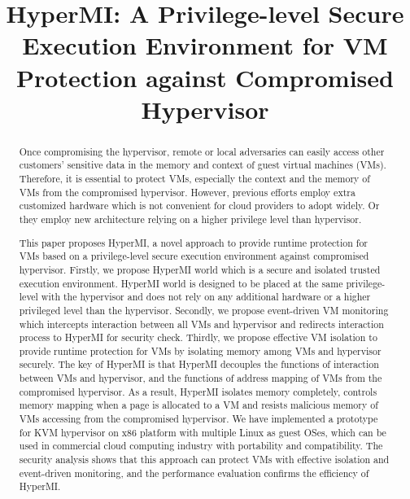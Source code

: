 \documentclass[conference]{IEEEtran}
\begin{document}
\title{HyperMI: A Privilege-level Secure Execution Environment for VM Protection against Compromised Hypervisor}
\author{
\IEEEauthorblockA{\textit{Institute of Information Engineering, Chinese Academy of Sciences} \\
\textit{School of Cyber Security, University of Chinese Academy of Sciences}\\
\{liuwenqing,linkunli,zhangkun,tubibo\}@iie.ac.cn}


}

\maketitle

\begin{abstract}

Once compromising the hypervisor, remote or local adversaries can easily access other customers' sensitive data in the memory and context of guest virtual machines (VMs).
Therefore, it is essential to protect VMs, especially the context and the memory of VMs from the compromised hypervisor.
However, previous efforts employ extra customized hardware which is not convenient for cloud providers to adopt widely. Or they employ new architecture relying on a higher privilege level than hypervisor. 

This paper proposes HyperMI, a novel approach to provide runtime protection for VMs based on a privilege-level secure execution environment against compromised hypervisor. 
Firstly, we propose HyperMI world which is a secure and isolated trusted execution environment. HyperMI world is designed to be placed at the same privilege-level with the hypervisor and does not rely on any additional hardware or a higher privileged level than the hypervisor. Secondly, we propose event-driven VM monitoring which intercepts interaction between all VMs and hypervisor and redirects interaction process to HyperMI for security check. Thirdly, we propose effective VM isolation to provide runtime protection for VMs by isolating memory among VMs and hypervisor securely. 
The key of HyperMI is that HyperMI decouples the functions of interaction between VMs and hypervisor, and the functions of address mapping of VMs from the compromised hypervisor. As a result, HyperMI isolates memory completely, controls memory mapping when a page is allocated to a VM and resists malicious memory of VMs accessing from the compromised hypervisor.
We have implemented a prototype for KVM hypervisor on x86 platform with multiple Linux as guest OSes, which can be used in commercial cloud computing industry with portability and compatibility. The security analysis shows that this approach can protect VMs with effective isolation and event-driven monitoring, and the performance evaluation confirms the efficiency of HyperMI.




\end{abstract}
\end{document}
